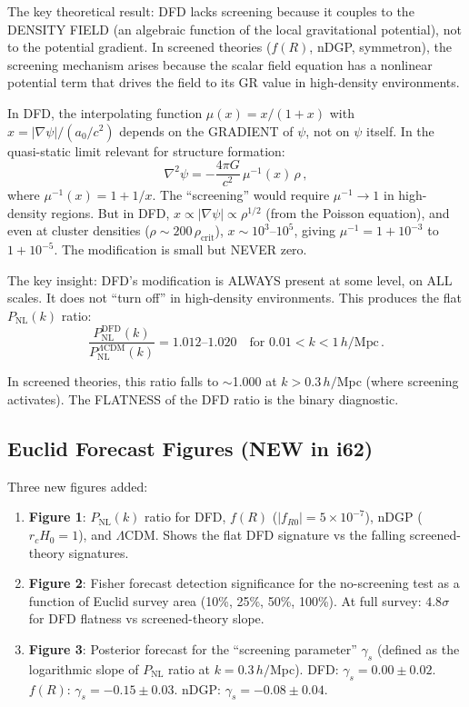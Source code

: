 \documentclass[11pt,a4paper]{article}
\begin{document}
The key theoretical result: DFD lacks screening because it couples to the DENSITY FIELD (an algebraic function of the local gravitational potential), not to the potential gradient. In screened theories ($f(R)$, nDGP, symmetron), the screening mechanism arises because the scalar field equation has a nonlinear potential term that drives the field to its GR value in high-density environments.

In DFD, the interpolating function $\mu(x) = x/(1+x)$ with $x = |\nabla\psi|/(a_0/c^2)$ depends on the GRADIENT of $\psi$, not on $\psi$ itself. In the quasi-static limit relevant for structure formation:
\begin{equation}
\nabla^2\psi = -\frac{4\pi G}{c^2}\,\mu^{-1}(x)\,\rho\,,
\end{equation}
where $\mu^{-1}(x) = 1 + 1/x$. The ``screening'' would require $\mu^{-1} \to 1$ in high-density regions. But in DFD, $x \propto |\nabla\psi| \propto \rho^{1/2}$ (from the Poisson equation), and even at cluster densities ($\rho \sim 200\,\rho_{\mathrm{crit}}$), $x \sim 10^3$--$10^5$, giving $\mu^{-1} = 1 + 10^{-3}$ to $1 + 10^{-5}$. The modification is small but NEVER zero.

The key insight: DFD's modification is ALWAYS present at some level, on ALL scales. It does not ``turn off'' in high-density environments. This produces the flat $P_{\mathrm{NL}}(k)$ ratio:
\begin{equation}
\frac{P_{\mathrm{NL}}^{\mathrm{DFD}}(k)}{P_{\mathrm{NL}}^{\Lambda\mathrm{CDM}}(k)} = 1.012\text{--}1.020 \quad \text{for } 0.01 < k < 1\,h/\text{Mpc}\,.
\end{equation}

In screened theories, this ratio falls to $\sim$1.000 at $k > 0.3\,h/$Mpc (where screening activates). The FLATNESS of the DFD ratio is the binary diagnostic.

\subsection{Euclid Forecast Figures (NEW in i62)}

Three new figures added:

\begin{enumerate}
\item \textbf{Figure 1}: $P_{\mathrm{NL}}(k)$ ratio for DFD, $f(R)$ ($|f_{R0}| = 5 \times 10^{-7}$), nDGP ($r_c H_0 = 1$), and $\Lambda$CDM. Shows the flat DFD signature vs the falling screened-theory signatures.

\item \textbf{Figure 2}: Fisher forecast detection significance for the no-screening test as a function of Euclid survey area (10\%, 25\%, 50\%, 100\%). At full survey: $4.8\sigma$ for DFD flatness vs screened-theory slope.

\item \textbf{Figure 3}: Posterior forecast for the ``screening parameter'' $\gamma_s$ (defined as the logarithmic slope of $P_{\mathrm{NL}}$ ratio at $k = 0.3\,h/$Mpc). DFD: $\gamma_s = 0.00 \pm 0.02$. $f(R)$: $\gamma_s = -0.15 \pm 0.03$. nDGP: $\gamma_s = -0.08 \pm 0.04$.
\end{enumerate}
\end{document}
